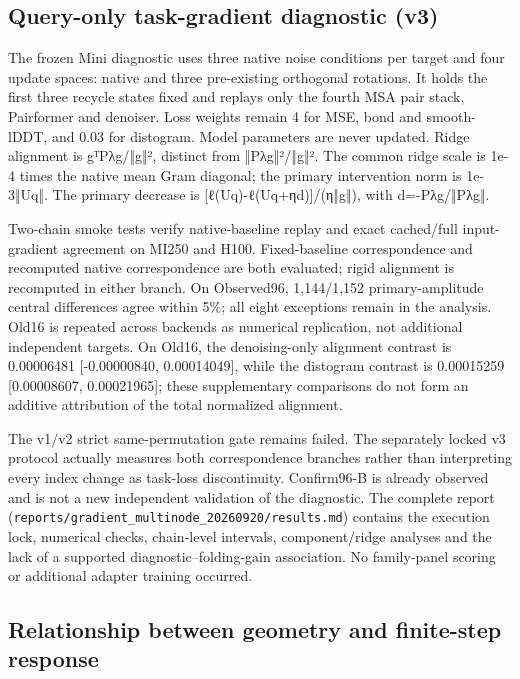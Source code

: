 \subsection{Query-only task-gradient diagnostic (v3)}\label{query-only-task-gradient-diagnostic-v3}

The frozen Mini diagnostic uses three native noise conditions per target and
four update spaces: native and three pre-existing orthogonal rotations. It
holds the first three recycle states fixed and replays only the fourth MSA
pair stack, Pairformer and denoiser. Loss weights remain 4 for MSE, bond and
smooth-lDDT, and 0.03 for distogram. Model parameters are never updated.
Ridge alignment is gᵀPλg/‖g‖², distinct from ‖Pλg‖²/‖g‖². The common ridge
scale is 1e-4 times the native mean Gram diagonal; the primary intervention
norm is 1e-3‖Uq‖. The primary decrease is
{[}ℓ(Uq)-ℓ(Uq+ηd){]}/(η‖g‖), with d=-Pλg/‖Pλg‖.

Two-chain smoke tests verify native-baseline replay and exact cached/full
input-gradient agreement on MI250 and H100. Fixed-baseline correspondence and
recomputed native correspondence are both evaluated; rigid alignment is
recomputed in either branch. On Observed96, 1,144/1,152 primary-amplitude
central differences agree within 5\%; all eight exceptions remain in the
analysis. Old16 is repeated across backends as numerical replication, not
additional independent targets. On Old16, the denoising-only alignment
contrast is 0.00006481 {[}-0.00000840, 0.00014049{]}, while the distogram contrast
is 0.00015259 {[}0.00008607, 0.00021965{]}; these supplementary comparisons do not
form an additive attribution of the total normalized alignment.

The v1/v2 strict same-permutation gate remains failed. The separately locked
v3 protocol actually measures both correspondence branches rather than
interpreting every index change as task-loss discontinuity. Confirm96-B is
already observed and is not a new independent validation of the diagnostic.
The complete report (\nolinkurl{reports/gradient_multinode_20260920/results.md})
contains the execution lock, numerical checks, chain-level intervals,
component/ridge analyses and the lack of a supported diagnostic--folding-gain
association. No family-panel scoring or additional adapter training occurred.

\subsection{Relationship between geometry and finite-step response}\label{relationship-between-geometry-and-finite-step-response}

